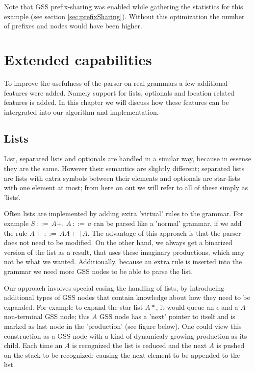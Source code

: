 \documentclass[a4paper,10pt]{article}
\begin{document}
Note that GSS prefix-sharing was enabled while gathering the statistics for this example (see section \ref{sec:prefixSharing}). Without this optimization the number of prefixes and nodes would have been higher.

\section{Extended capabilities}

To improve the usefulness of the parser on real grammars a few additional features were added. Namely support for lists, optionals and location related features is added. In this chapter we will discuss how these features can be intergrated into our algorithm and implementation.

\subsection{Lists}

List, separated lists and optionals are handled in a similar way, because in essense they are the same. However their semantics are slightly different; separated lists are lists with extra symbols between their elements and optionals are star-lists with one element at most; from here on out we will refer to all of these simply as 'lists'.

Often lists are implemented by adding extra 'virtual' rules to the grammar. For example $S\,::=\,A+,\,A\,::=\,a$ can be parsed like a 'normal' grammar, if we add the rule $A+\,::=\,AA+\,|\,A$. The advantage of this approach is that the parser does not need to be modified. On the other hand, we always get a binarized version of the list as a result, that uses these imaginary productions, which may not be what we wanted. Additionally, because an extra rule is inserted into the grammar we need more GSS nodes to be able to parse the list.

Our approach involves special casing the handling of lists, by introducing additional types of GSS nodes that contain knowledge about how they need to be expanded. For example to expand the star-list $A*$, it would queue an $\epsilon$ and a $A$ non-terminal GSS node; this $A$ GSS node has a 'next' pointer to itself and is marked as last node in the 'production' (see figure below). One could view this construction as a GSS node with a kind of dynamicaly growing production as its child. Each time an $A$ is recognized the list is reduced and the next $A$ is pushed on the stack to be recognized; causing the next element to be appended to the list.
\end{document}
